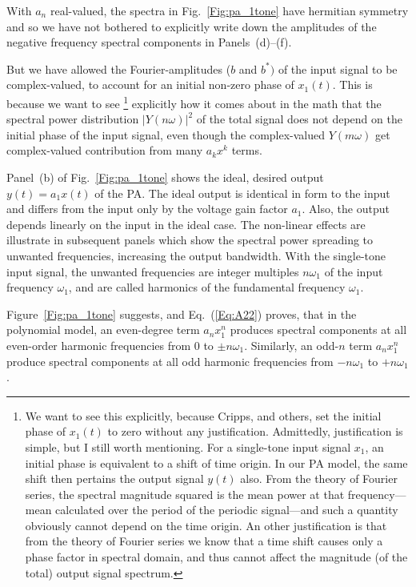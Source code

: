 \documentclass[11pt,oneside,a4paper]{scrartcl}
\newcommand{\Eq}[1]{Eq.~(\ref{Eq:#1})}
\newcommand{\Figure}[1]{Figure~\ref{Fig:#1}}
\newcommand{\Fig}[1]{Fig.~\ref{Fig:#1}}
\newcommand{\Abs}[1]{\ensuremath{\left|#1\right|}}
\newcommand{\cc}[1]{\ensuremath{{#1}^*}}
\begin{document}
With $a_n$ real-valued, the spectra in \Fig{pa_1tone} have hermitian symmetry and so we have not bothered to explicitly write down the amplitudes of the negative frequency spectral components in Panels~(d)--(f). 

But we have allowed the Fourier-amplitudes ($b$ and $\cc b)$ of the input signal to be complex-valued, to account for an initial non-zero phase of $x_1(t)$. This is because we want to see \footnote{ 
We want to see this explicitly, because Cripps, and others, set the initial phase of $x_1(t)$ to zero without any justification. Admittedly, justification is simple, but I still worth mentioning. For a single-tone input signal $x_1$, an initial phase is equivalent to a shift of time origin. In our PA model, the same shift then pertains the output signal $y(t)$ also. From the theory of Fourier series, the spectral magnitude squared is the mean power at that frequency---mean calculated over the period of the periodic signal---and such a quantity obviously cannot depend on the time origin. An other justification is that from the theory of Fourier series we know that a time shift causes only a phase factor in spectral domain, and thus cannot affect the magnitude (of the total) output signal spectrum.}
%
explicitly how it comes about in the math that the spectral power distribution $\Abs{Y(n\omega)}^2$ of the total signal does not depend on the initial phase of the input signal, even though the complex-valued $Y(m\omega)$ get complex-valued contribution from many $a_k x^k$ terms. 

Panel~(b) of \Fig{pa_1tone} shows the ideal, desired output $y(t) = a_1 x(t)$ of the PA. The ideal output is identical in form to the input and differs from the input only by the voltage gain factor $a_1$. Also, the output depends linearly on the input in the ideal case. The non-linear effects are illustrate in subsequent panels which show the spectral power spreading to unwanted frequencies, increasing the output bandwidth. With the single-tone input signal, the unwanted frequencies are integer multiples $n\omega_1$ of the input frequency $\omega_1$, and are called harmonics of the fundamental frequency $\omega_1$. 

\Figure{pa_1tone} suggests, and \Eq{A22} proves, that in the polynomial model, an even-degree term $a_n x_1^n$ produces spectral components at all even-order harmonic frequencies from $0$ to $\pm n\omega_1$. Similarly, an odd-$n$ term $a_n x_1^n$ produce spectral components at all odd harmonic frequencies from $-n\omega_1$ to 
$+n\omega_1$. 
\end{document}
